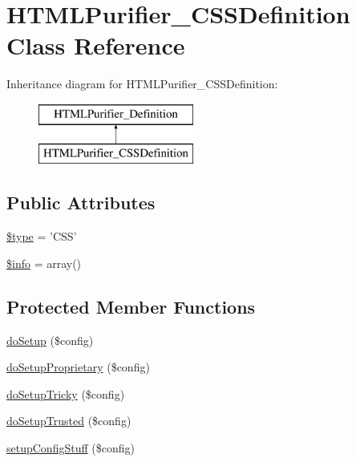\hypertarget{classHTMLPurifier__CSSDefinition}{\section{H\+T\+M\+L\+Purifier\+\_\+\+C\+S\+S\+Definition Class Reference}
\label{classHTMLPurifier__CSSDefinition}
}
Inheritance diagram for H\+T\+M\+L\+Purifier\+\_\+\+C\+S\+S\+Definition\+:\begin{figure}[H]
\begin{center}
\leavevmode
\includegraphics[height=2.000000cm]{classHTMLPurifier__CSSDefinition}
\end{center}
\end{figure}
\subsection*{Public Attributes}
\begin{DoxyCompactItemize}
\item 
\hyperlink{classHTMLPurifier__CSSDefinition_ac4de0630820d8d83f555ab4eb9b9e6e6}{\$type} = 'C\+S\+S'
\item 
\hyperlink{classHTMLPurifier__CSSDefinition_aef5447a5d3a7ab1af3ca143c39a22ec8}{\$info} = array()
\end{DoxyCompactItemize}
\subsection*{Protected Member Functions}
\begin{DoxyCompactItemize}
\item 
\hyperlink{classHTMLPurifier__CSSDefinition_a205ec3e05b2fb05c1cd37e37d7f03cc0}{do\+Setup} (\$config)
\item 
\hyperlink{classHTMLPurifier__CSSDefinition_aa8464eac4142925297e2cc30199797b9}{do\+Setup\+Proprietary} (\$config)
\item 
\hyperlink{classHTMLPurifier__CSSDefinition_a59deee210081fc3c87259f71a0f48c88}{do\+Setup\+Tricky} (\$config)
\item 
\hyperlink{classHTMLPurifier__CSSDefinition_a344a0133680bcc62ea38fead1cf2dc39}{do\+Setup\+Trusted} (\$config)
\item 
\hyperlink{classHTMLPurifier__CSSDefinition_a3e7210170e6f01e3b9149174e673977e}{setup\+Config\+Stuff} (\$config)
\end{DoxyCompactItemize}
